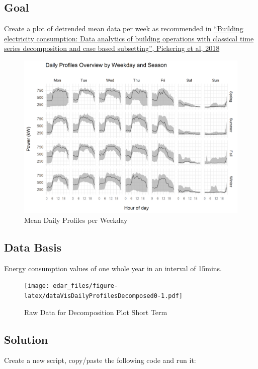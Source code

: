 \documentclass[
]{book}
\begin{document}
\hypertarget{goal-11}{%
\subsection{Goal}\label{goal-11}}

Create a plot of detrended mean data per week as recommended in \href{https://doi.org/10.1016/j.enbuild.2018.07.056}{``Building electricity consumption: Data analytics of building operations with classical time series decomposition and case based subsetting'', Pickering et al, 2018}

\begin{figure}
\includegraphics[width=0.7\linewidth]{images/plotDailyProfDecomposed} \caption{Mean Daily Profiles per Weekday}\label{fig:unnamed-chunk-20}
\end{figure}

\hypertarget{data-basis-11}{%
\subsection{Data Basis}\label{data-basis-11}}

Energy consumption values of one whole year in an interval of 15mins.

\begin{figure}
\centering
\texttt{[image: edar\_files/figure-latex/dataVisDailyProfilesDecomposed0-1.pdf]}
\caption{\label{fig:dataVisDailyProfilesDecomposed0}Raw Data for Decomposition Plot Short Term}
\end{figure}

\hypertarget{solution-11}{%
\subsection{Solution}\label{solution-11}}

Create a new script, copy/paste the following code and run it:
\end{document}
